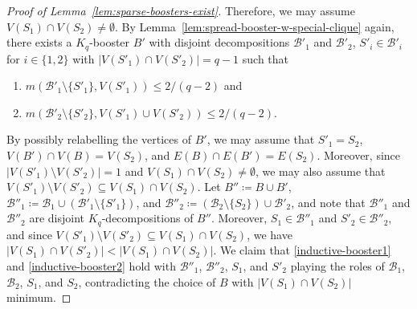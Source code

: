 \documentclass[11pt]{article}
\numberwithin{equation}{section}
\newcounter{i}
\theoremstyle{plain}
\theoremstyle{plain} %
\theoremstyle{definition}
\newcommand{\cB}{\mathcal{B}}
\begin{document}
\begin{proof}[Proof of Lemma~\ref{lem:sparse-boosters-exist}]
    Therefore, we may assume $V(S_1) \cap V(S_2) \neq \emptyset$.
    By Lemma~\ref{lem:spread-booster-w-special-clique} again, there exists a $K_q$-booster $B'$ with disjoint decompositions $\cB'_1$ and $\cB'_2$, $S'_i \in \cB'_i$ for $i \in \{1,2\}$ with $|V(S'_1) \cap V(S'_2)| = q - 1$ such that 
    \begin{enumerate}[label=(\ref*{lem:sparse-boosters-exist}.\arabic*'), leftmargin=*]
        \item\label{inductive-booster1'} $m(\cB'_1\setminus\{S'_1\}, V(S'_1)) \leq 2 / (q-2)$ and  
        \item\label{inductive-booster2'} $m(\cB'_2\setminus\{S'_2\}, V(S'_1) \cup V(S'_2)) \leq 2/(q - 2)$.
    \end{enumerate}
    By possibly relabelling the vertices of $B'$, we may assume that $S'_1 = S_2$, $V(B') \cap V(B) = V(S_2)$, and $E(B) \cap E(B') = E(S_2)$.  Moreover, since $|V(S'_1) \setminus V(S'_2)| = 1$ and $V(S_1) \cap V(S_2) \neq \emptyset$, we may also assume that $V(S'_1) \setminus V(S'_2) \subseteq V(S_1) \cap V(S_2)$.
    Let $B'' \coloneqq B \cup B'$, $\cB''_1 \coloneqq \cB_1 \cup (\cB'_1\setminus\{S'_1\})$, and $\cB''_2 \coloneqq (\cB_2\setminus \{S_2\}) \cup \cB'_2$,
    and note that $\cB''_1$ and $\cB''_2$ are disjoint $K_q$-decompositions of $B''$.  Moreover, $S_1 \in \cB''_1$ and $S'_2 \in \cB''_2$, and since $V(S'_1) \setminus V(S'_2) \subseteq V(S_1) \cap V(S_2)$, we have $|V(S_1) \cap V(S'_2)| < |V(S_1) \cap V(S_2)|$.  We claim that \ref{inductive-booster1} and \ref{inductive-booster2} hold with $\cB''_1$, $\cB''_2$, $S_1$, and $S'_2$ playing the roles of $\cB_1$, $\cB_2$, $S_1$, and $S_2$, contradicting the choice of $B$ with $|V(S_1) \cap V(S_2)|$ minimum.


\end{proof}
\end{document}
